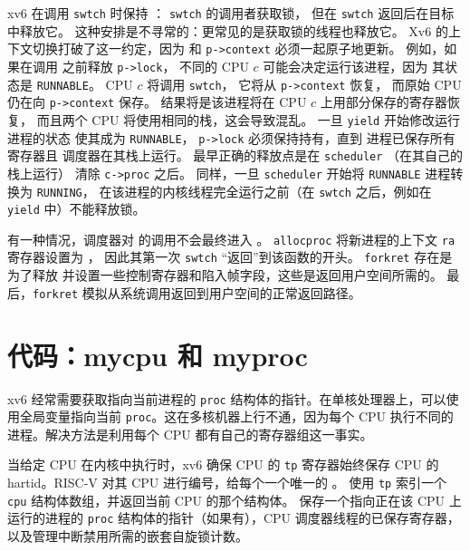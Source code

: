 xv6 在调用
\lstinline{swtch}
时保持
：
\lstinline{swtch}
的调用者获取锁，
但在 {\tt swtch} 返回后在目标中释放它。
这种安排是不寻常的：更常见的是获取锁的线程也释放它。
Xv6 的上下文切换打破了这一约定，因为
和
\lstinline{p->context}
必须一起原子地更新。
例如，如果在调用
之前释放
\lstinline{p->lock}，
不同的 CPU $c$ 可能会决定运行该进程，因为
其状态是 \lstinline{RUNNABLE}。
CPU $c$ 将调用 \lstinline{swtch}，
它将从 \lstinline{p->context} 恢复，
而原始 CPU 仍在向
\lstinline{p->context}
保存。
结果将是该进程将在 CPU $c$ 上用部分保存的寄存器恢复，
而且两个 CPU 将使用相同的栈，这会导致混乱。
一旦 \lstinline{yield} 开始修改运行进程的状态
使其成为
\lstinline{RUNNABLE}，
\lstinline{p->lock} 必须保持持有，直到
进程已保存所有寄存器且
调度器在其栈上运行。
最早正确的释放点是在
\lstinline{scheduler}
（在其自己的栈上运行）
清除
\lstinline{c->proc}
之后。
同样，一旦
\lstinline{scheduler}
开始将 \lstinline{RUNNABLE} 进程转换为
\lstinline{RUNNING}，
在该进程的内核线程完全运行之前（在
\lstinline{swtch}
之后，例如在
\lstinline{yield}
中）不能释放锁。

有一种情况，调度器对
的调用不会最终进入
。
\lstinline{allocproc} 将新进程的上下文 {\tt ra} 寄存器设置为
，
因此其第一次 \lstinline{swtch} ``返回''到该函数的开头。
\lstinline{forkret}
存在是为了释放
并设置一些控制寄存器和陷入帧字段，这些是返回用户空间所需的。
最后，{\tt forkret} 模拟从系统调用返回到用户空间的正常返回路径。


\section{代码：mycpu 和 myproc}

xv6 经常需要获取指向当前进程的 \lstinline{proc} 结构体的指针。在单核处理器上，可以使用全局变量指向当前 \lstinline{proc}。这在多核机器上行不通，因为每个 CPU 执行不同的进程。解决方法是利用每个 CPU 都有自己的寄存器组这一事实。

当给定 CPU 在内核中执行时，xv6 确保 CPU 的 \lstinline{tp} 寄存器始终保存 CPU 的 hartid。RISC-V 对其 CPU 进行编号，给每个一个唯一的 。
使用 \lstinline{tp} 索引一个
\lstinline{cpu} 结构体数组，并返回当前 CPU 的那个结构体。
保存一个指向正在该 CPU 上运行的进程的 \lstinline{proc} 结构体的指针（如果有），CPU 调度器线程的已保存寄存器，以及管理中断禁用所需的嵌套自旋锁计数。

